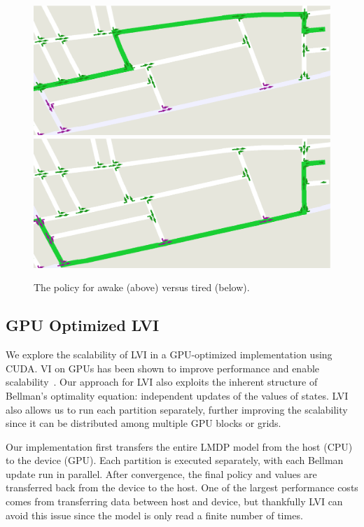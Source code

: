 \begin{figure}%
\begin{center}
    \includegraphics[width=0.75\linewidth]{awake.eps} \\
    \includegraphics[width=0.75\linewidth]{tired.eps}
    \caption{The policy for awake (above) versus tired (below).}
    \label{fig:example_policy}
\end{center}
\end{figure}


\subsection{GPU Optimized LVI}

We explore the scalability of LVI in a GPU-optimized implementation using CUDA. VI on GPUs has been shown to improve performance and enable scalability~\cite{Johannsson09-GPUBasedMDPSolver,Boussard10-ObservationalPlanningMDPGPU}. Our approach for LVI also exploits the inherent structure of Bellman's optimality equation: independent updates of the values of states. LVI also allows us to run each partition separately, further improving the scalability since it can be distributed among multiple GPU blocks or grids.

Our implementation first transfers the entire LMDP model from the host (CPU) to the device (GPU). Each partition is executed separately, with each Bellman update run in parallel. After convergence, the final policy and values are transferred back from the device to the host. One of the largest performance costs comes from transferring data between host and device, but thankfully LVI can avoid this issue since the model is only read a finite number of times.


